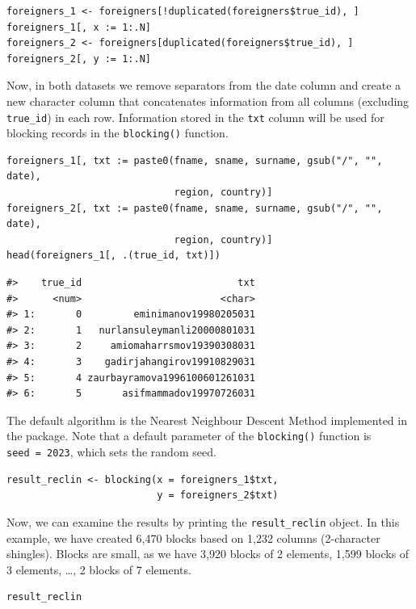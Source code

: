 \begin{verbatim}
foreigners_1 <- foreigners[!duplicated(foreigners$true_id), ]
foreigners_1[, x := 1:.N]
foreigners_2 <- foreigners[duplicated(foreigners$true_id), ]
foreigners_2[, y := 1:.N]
\end{verbatim}

Now, in both datasets we remove separators from the date column and
create a new character column that concatenates information from all
columns (excluding \texttt{true\_id}) in each row. Information stored in the
\texttt{txt} column will be used for blocking records in the \texttt{blocking()}
function.

\begin{verbatim}
foreigners_1[, txt := paste0(fname, sname, surname, gsub("/", "", date), 
                             region, country)]
foreigners_2[, txt := paste0(fname, sname, surname, gsub("/", "", date), 
                             region, country)]
head(foreigners_1[, .(true_id, txt)])
\end{verbatim}

\begin{verbatim}
#>    true_id                           txt
#>      <num>                        <char>
#> 1:       0         eminimanov19980205031
#> 2:       1   nurlansuleymanli20000801031
#> 3:       2     amiomaharrsmov19390308031
#> 4:       3    gadirjahangirov19910829031
#> 5:       4 zaurbayramova1996100601261031
#> 6:       5       asifmammadov19970726031
\end{verbatim}

The default algorithm is the Nearest Neighbour Descent Method
\citep{Dong2011} implemented in the  package. Note that a
default parameter of the \texttt{blocking()} function is \texttt{seed\ =\ 2023}, which sets
the random seed.

\begin{verbatim}
result_reclin <- blocking(x = foreigners_1$txt,
                          y = foreigners_2$txt)
\end{verbatim}

Now, we can examine the results by printing the \texttt{result\_reclin} object.
In this example, we have created
6,470
blocks based on 1,232
columns (2-character shingles). Blocks are small, as we have
3,920 blocks of 2
elements, 1,599 blocks of
3 elements, \ldots,
2 blocks of
7 elements.

\begin{verbatim}
result_reclin
\end{verbatim}

